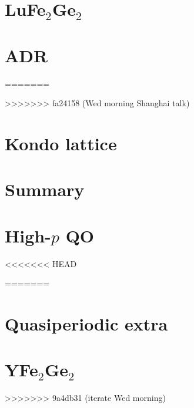\section{LuFe$_2$Ge$_2$}

% 

\section{ADR}

=======

>>>>>>> fa24158 (Wed morning Shanghai talk)




\section{Kondo lattice}


%


\section{Summary}



\appendix


\section{High-$p$ QO}



<<<<<<< HEAD

=======

\section{Quasiperiodic extra}


%
%



\section{YFe$_2$Ge$_2$}
>>>>>>> 9a4db31 (iterate Wed morning)





